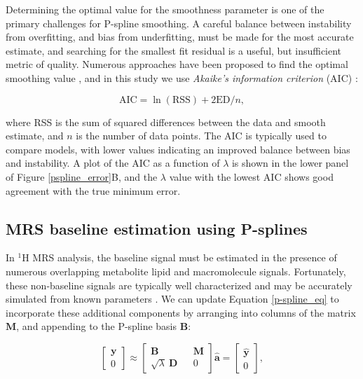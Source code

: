 \documentclass[num-refs]{wiley-article}
\begin{document}
Determining the optimal value for the smoothness parameter is one of the primary challenges for P-spline smoothing. A careful balance between instability from overfitting, and bias from underfitting, must be made for the most accurate estimate, and searching for the smallest fit residual is a useful, but insufficient metric of quality. Numerous approaches have been proposed to find the optimal smoothing value \cite{Ruppert2003}, and in this study we use \textit{Akaike's information criterion} (AIC) \cite{Akaike1973}:


\begin{equation}
  \textrm{AIC} = \ln(\textrm{RSS}) + 2 \textrm{ED} / n,
  \label{aic}
\end{equation}

where RSS is the sum of squared differences between the data and smooth estimate, and $n$ is the number of data points. The AIC is typically used to compare models, with lower values indicating an improved balance between bias and instability. A plot of the AIC as a function of $\lambda$ is shown in the lower panel of Figure \ref{pspline_error}B, and the $\lambda$ value with the lowest AIC shows good agreement with the true minimum error.

\subsection{MRS baseline estimation using P-splines}

In $^1\mathrm{H}$ MRS analysis, the baseline signal must be estimated in the presence of numerous overlapping metabolite lipid and macromolecule signals. Fortunately, these non-baseline signals are typically well characterized and may be accurately simulated from known parameters \cite{Govind2015}. We can update Equation \ref{p-spline_eq} to incorporate these additional components by arranging into columns of the matrix $\mathbf{M}$, and appending to the P-spline basis $\mathbf{B}$:

\begin{equation}
  \begin{bmatrix}
    \textbf{y} \\ 0
  \end{bmatrix}
  \approx
  \begin{bmatrix}
    \textbf{B} && \textbf{M} \\ \sqrt{\lambda} \ \textbf{D} && 0
  \end{bmatrix} \hat{\mathbf{a}} =
  \begin{bmatrix}
    \hat{\textbf{y}} \\ 0
  \end{bmatrix},
\end{equation}
\end{document}

